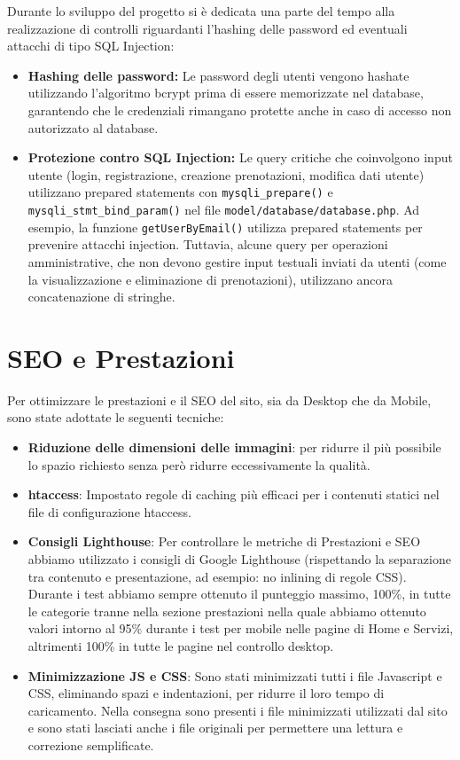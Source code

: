 \documentclass{article}
\begin{document}
Durante lo sviluppo del progetto si è dedicata una parte del tempo alla realizzazione di controlli riguardanti l'hashing delle password ed eventuali attacchi di tipo SQL Injection:

\begin{itemize}
    \item \textbf{Hashing delle password:} Le password degli utenti vengono hashate utilizzando l'algoritmo bcrypt prima di essere memorizzate nel database, garantendo che le credenziali rimangano protette anche in caso di accesso non autorizzato al database.
    
    \item \textbf{Protezione contro SQL Injection:} Le query critiche che coinvolgono input utente (login, registrazione, creazione prenotazioni, modifica dati utente) utilizzano prepared statements con \texttt{mysqli\_prepare()} e \texttt{mysqli\_stmt\_bind\_param()} nel file \texttt{model/database/database.php}. Ad esempio, la funzione \texttt{getUserByEmail()} utilizza prepared statements per prevenire attacchi injection. Tuttavia, alcune query per operazioni amministrative, che non devono gestire input testuali inviati da utenti (come la visualizzazione e eliminazione di prenotazioni), utilizzano ancora concatenazione di stringhe.
\end{itemize}



\section{SEO e Prestazioni} 
Per ottimizzare le prestazioni e il SEO del sito, sia da Desktop che da Mobile, sono state adottate le seguenti tecniche:
\begin{itemize}
    \item \textbf{Riduzione delle dimensioni delle immagini}: per ridurre il più possibile lo spazio richiesto senza però ridurre eccessivamente la qualità.
    \item \textbf{htaccess}: Impostato regole di caching più efficaci per i contenuti statici nel file di configurazione htaccess.
    \item \textbf{Consigli Lighthouse}: Per controllare le metriche di Prestazioni e SEO abbiamo utilizzato i consigli di Google Lighthouse (rispettando la separazione tra contenuto e presentazione, ad esempio: no inlining di regole CSS). Durante i test abbiamo sempre ottenuto il punteggio massimo, 100\%, in tutte le categorie tranne nella sezione prestazioni nella quale abbiamo ottenuto valori intorno al 95\% durante i test per mobile nelle pagine di Home e Servizi, altrimenti 100\% in tutte le pagine nel controllo desktop.
    \item \textbf{Minimizzazione JS e CSS}: Sono stati minimizzati tutti i file Javascript e CSS, eliminando spazi e indentazioni, per ridurre il loro tempo di caricamento. Nella consegna sono presenti i file minimizzati utilizzati dal sito e sono stati lasciati anche i file originali per permettere una lettura e correzione semplificate.

\end{itemize}
\end{document}
